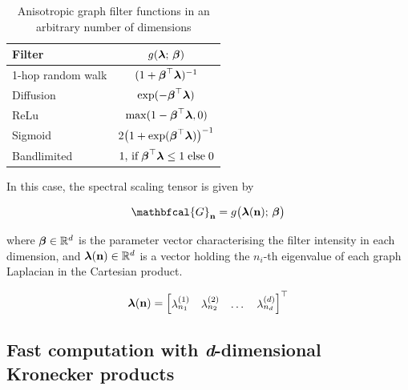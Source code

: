 \begin{table}[t]
    \def\arraystretch{1.7}
    \small
    \begin{center}
        \begin{tabular}{|l|c|}
            \hline
            \textbf{Filter}   & $g(\boldsymbol{\lambda}; \,\boldsymbol{\beta})$                                            \\
            \hline
            1-hop random walk & $(1 + \boldsymbol{\beta}^\top\boldsymbol{\lambda})^{-1}$                                   \\
            \hline
            Diffusion         & $\exp(-\boldsymbol{\beta}^\top\boldsymbol{\lambda})$                                       \\
            \hline
            ReLu              & $\max (1 - \boldsymbol{\beta}^\top\boldsymbol{\lambda}, 0)$                                \\
            \hline
            Sigmoid           & $2 \big( 1 + \exp(\boldsymbol{\beta}^\top\boldsymbol{\lambda})\big)^{-1}$                  \\
            \hline
            Bandlimited       & $1, \,\text{if} \; \boldsymbol{\beta}^\top\boldsymbol{\lambda} \leq 1 \; \text{else} \; 0$ \\
            \hline
        \end{tabular}
    \end{center}
    \caption{Anisotropic graph filter functions in an arbitrary number of dimensions}
    \label{tab:anis_filters}
\end{table}


In this case, the spectral scaling tensor is given by 

\begin{equation}
    \mathbfcal{G}_{\mathbf{n}} = g\big(\lambdaa(\mathbf{n}); \, \betaa\big)
\end{equation}

where $\boldsymbol{\beta} \in \mathbb{R}^{d}$ is the parameter vector characterising the filter intensity in each dimension, and $\boldsymbol{\lambda}(\mathbf{n}) \in \mathbb{R}^d$ is a vector holding the $n_i$-th eigenvalue of each graph Laplacian in the Cartesian product. 

$$
\boldsymbol{\lambda}(\mathbf{n}) = 
\begin{bmatrix}
    \lambda^{(1)}_{n_1} & \lambda^{(2)}_{n_2} & \dots & \lambda^{(d)}_{n_d}    
\end{bmatrix}^\top
$$

\subsection{Fast computation with \textit{d}-dimensional Kronecker products}

